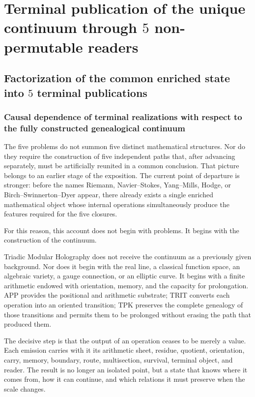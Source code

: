 \section{Terminal publication of the unique continuum through \(5\) non-permutable readers}
\subsection{Factorization of the common enriched state into \(5\) terminal publications}
\subsubsection{Causal dependence of terminal realizations with respect to the fully constructed genealogical continuum}
The five problems do not summon five distinct mathematical structures. Nor do they require the construction of five independent paths that, after advancing separately, must be artificially reunited in a common conclusion. That picture belongs to an earlier stage of the exposition. The current point of departure is stronger: before the names Riemann, Navier–Stokes, Yang–Mills, Hodge, or Birch–Swinnerton–Dyer appear, there already exists a single enriched mathematical object whose internal operations simultaneously produce the features required for the five closures.\par
For this reason, this account does not begin with problems. It begins with the construction of the continuum.\par
Triadic Modular Holography does not receive the continuum as a previously given background. Nor does it begin with the real line, a classical function space, an algebraic variety, a gauge connection, or an elliptic curve. It begins with a finite arithmetic endowed with orientation, memory, and the capacity for prolongation. APP provides the positional and arithmetic substrate; TRIT converts each operation into an oriented transition; TPK preserves the complete genealogy of those transitions and permits them to be prolonged without erasing the path that produced them.\par
The decisive step is that the output of an operation ceases to be merely a value. Each emission carries with it its arithmetic sheet, residue, quotient, orientation, carry, memory, boundary, route, multisection, survival, terminal object, and reader. The result is no longer an isolated point, but a state that knows where it comes from, how it can continue, and which relations it must preserve when the scale changes.\par

